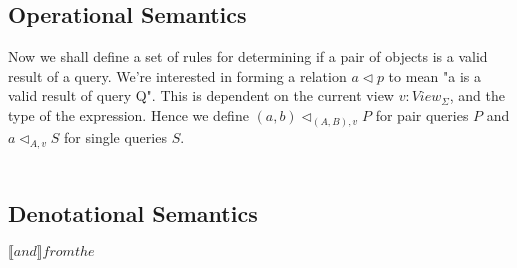 \documentclass[twoside,a4paper,11pt]{article}
\begin{document}
\subsection{Operational Semantics}

Now we shall define a set of rules for determining if a pair of objects is a valid result of a query. We're interested in forming a relation $a \triangleleft p$ to mean "a is a valid result of query Q". This is dependent on the current view $v: View_{\Sigma}$, and the type of the expression. Hence we define $(a, b) \triangleleft_{(A, B), v} P$ for pair queries $P$ and $a \triangleleft_{A,v} S$ for single queries $S$.

\[ \begin{array}{c}
\end{array} \]



\subsection{Denotational Semantics}

$\llbracket and \rrbracket from the $
\end{document}
